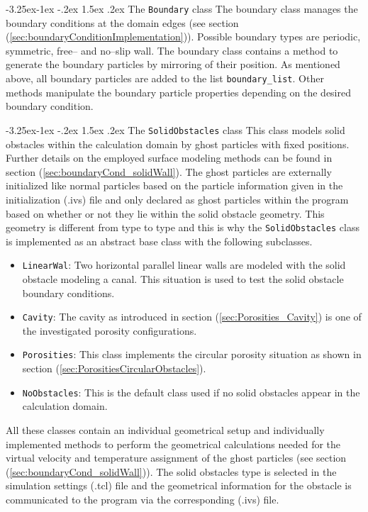 \documentclass{report}
\makeatletter
\renewcommand\paragraph{\@startsection{paragraph}{4}{\z@}%
  {-3.25ex\@plus -1ex \@minus -.2ex}%
  {1.5ex \@plus .2ex}%
  {\normalfont\normalsize\bfseries}}
\makeatother
\begin{document}
\paragraph{The {\tt Boundary} class} 
The boundary class manages the boundary conditions at the domain edges (see section (\ref{sec:boundaryConditionImplementation})). Possible boundary types are periodic, symmetric, free-- and no--slip wall. The boundary class contains a method to generate the boundary particles by mirroring of their position. As mentioned above, all boundary particles are added to the list {\tt boundary\_list}. Other methods manipulate the boundary particle properties depending on the desired boundary condition. 
 

\paragraph{The {\tt SolidObstacles} class}
This class models solid obstacles within the calculation domain by ghost particles with fixed positions. Further details on the employed surface modeling methods can be found in section (\ref{sec:boundaryCond_solidWall}). The ghost particles are externally initialized like normal particles based on the particle information given in the initialization (.ivs) file and only declared as ghost particles within the program based on whether or not they lie within the solid obstacle geometry. This geometry is different from type to type and this is why the {\tt SolidObstacles} class is implemented as an abstract base class with the following subclasses.
\begin{itemize}
 \item {\tt LinearWal}: Two horizontal parallel linear walls are modeled with the solid obstacle modeling a canal. This situation is used to test the solid obstacle boundary conditions.
\item {\tt Cavity}: The cavity as introduced in section (\ref{sec:Porosities_Cavity}) is one of the investigated porosity configurations.
\item {\tt Porosities}: This class implements the circular porosity situation as shown in section (\ref{sec:PorositiesCircularObstacles}).
\item {\tt NoObstacles}: This is the default class used if no solid obstacles appear in the calculation domain.
\end{itemize}
All these classes contain an individual geometrical setup and individually implemented methods to perform the geometrical calculations needed for the virtual velocity and temperature assignment of the ghost particles (see section (\ref{sec:boundaryCond_solidWall})).
The solid obstacles type is selected in the simulation settings (.tcl) file and the geometrical information for the obstacle is communicated to the program via the corresponding (.ivs) file.
\end{document}
